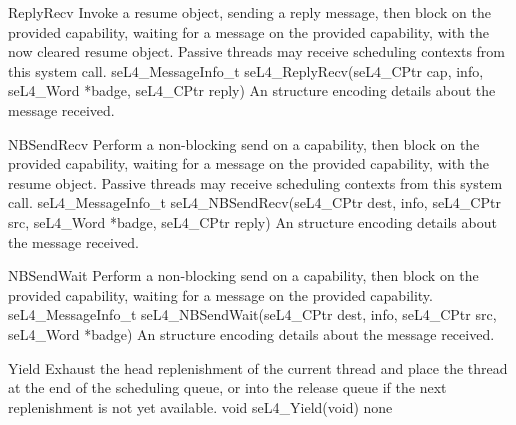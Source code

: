{ReplyRecv}
{Invoke a resume object, sending a reply message, then block on the provided capability, waiting for
a message on the provided capability, with the now cleared resume object. Passive threads may receive
scheduling contexts from  this system call.}
{seL4\_MessageInfo\_t seL4\_ReplyRecv(seL4\_CPtr cap,  info, seL4\_Word *badge,
seL4\_CPtr reply)}
{
}
{An  structure encoding details about the message received.}

{NBSendRecv}
{Perform a non-blocking send on a capability, then block on the provided capability, waiting for
a message on the provided capability, with the resume object. Passive threads may receive
scheduling contexts from this system call.}
{seL4\_MessageInfo\_t seL4\_NBSendRecv(seL4\_CPtr dest,  info, seL4\_CPtr src,
    seL4\_Word *badge, seL4\_CPtr reply)}
{
}
{An  structure encoding details about the message received.}

{NBSendWait}
{Perform a non-blocking send on a capability, then block on the provided capability, waiting for
a message on the provided capability.}
{seL4\_MessageInfo\_t seL4\_NBSendWait(seL4\_CPtr dest,  info, seL4\_CPtr src,
    seL4\_Word *badge)}
{
}
{An  structure encoding details about the message received.}

{Yield}
{Exhaust the head replenishment of the current thread and place the thread at the end of the
scheduling queue, or into the release queue if the next replenishment is not yet available.}
{void seL4\_Yield(void)}
{}
{none}


